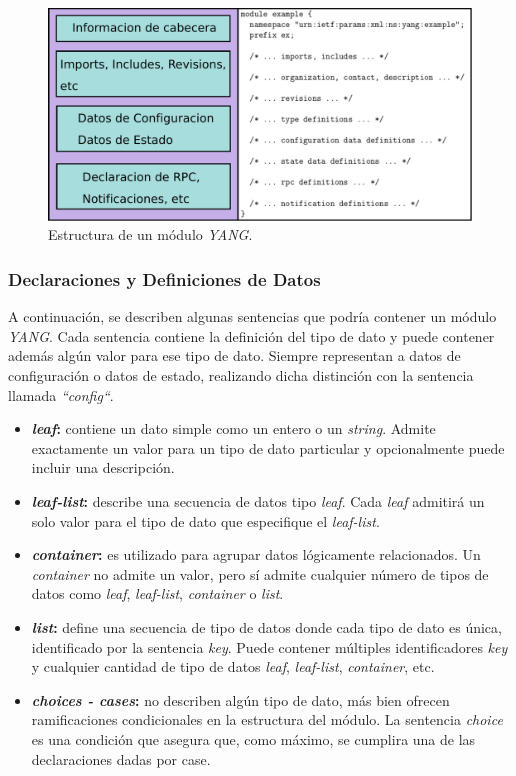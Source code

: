   \begin{figure}[htbp]
	\centering
	\includegraphics[scale=0.6]{Figures/estructura_modulo.pdf}
	\caption{Estructura de un módulo \textit{YANG}.}
	\label{fig:estructura_modulo}
  \end{figure}

  \subsubsection{Declaraciones y Definiciones de Datos}
  A continuación, se describen algunas sentencias que podría contener un módulo \textit{YANG}. Cada sentencia contiene la definición del tipo de dato y puede contener además algún valor para ese tipo de dato. Siempre representan a datos de configuración o datos de estado, realizando dicha distinción con la sentencia llamada \textit{“config“}.  

  \begin{itemize}
	\item \textbf{\textit{leaf}:} contiene un dato simple como un entero o un \textit{string}. Admite exactamente un valor para un tipo de dato particular y opcionalmente puede incluir una descripción. 
	\item \textbf{\textit{leaf-list}:} describe una secuencia de datos tipo \textit{leaf}. Cada \textit{leaf} admitirá un solo valor para el tipo de dato que especifique el \textit{leaf-list}.
	\item \textbf{\textit{container}:} es utilizado para agrupar datos lógicamente relacionados. Un \textit{container} no admite un valor, pero sí admite cualquier número de tipos de datos como \textit{leaf}, \textit{leaf-list}, \textit{container} o \textit{list}.
	\item \textbf{\textit{list}:} define una secuencia de tipo de datos donde cada tipo de dato es única, identificado por la sentencia \textit{key}. Puede contener múltiples identificadores \textit{key} y cualquier cantidad de tipo de datos \textit{leaf}, \textit{leaf-list}, \textit{container}, etc.
	\item \textbf{\textit{choices - cases}:} no describen algún tipo de dato, más bien ofrecen ramificaciones condicionales en la estructura del módulo. La sentencia \textit{choice} es una condición que asegura que, como máximo, se cumplira una de las declaraciones dadas por case.
\end{itemize}

